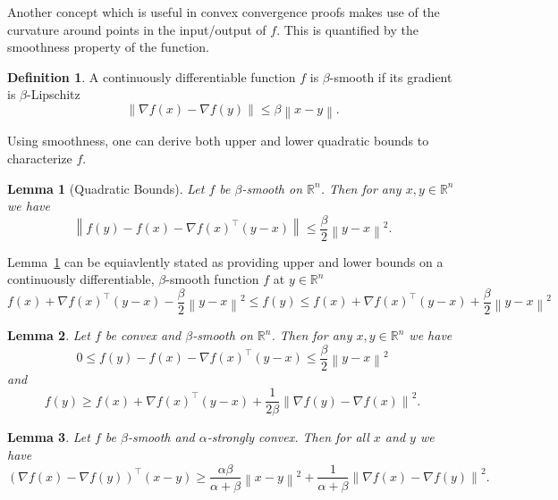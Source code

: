 \documentclass{article}
\newcommand{\R}{\mathbb R}
\newcommand{\norm}[1]{\left\| #1 \right\| }
\newtheorem{lemma}{Lemma}
\theoremstyle{definition}
\newtheorem{definition}{Definition}
\begin{document}
Another concept which is useful in convex convergence proofs makes use of the
curvature around points in the input/output of $f$. This is quantified by the
smoothness property of the function.

\begin{definition}
    A continuously differentiable function $f$ is $\beta$-smooth if its gradient
    is $\beta$-Lipschitz
    \begin{equation}
        \norm{\nabla f(x) - \nabla f(y)} \leq \beta \norm{x - y}.
    \end{equation}
\end{definition}

Using smoothness, one can derive both upper and lower quadratic bounds to
characterize $f$. 

\begin{lemma}[Quadratic Bounds]
    \label{lem:quadratic_bounds}
    Let $f$ be $\beta$-smooth on $\R^n$. Then for any $x, y \in \R^n$ we have 
    \begin{equation}
        \norm{f(y) - f(x) - \nabla {f(x)}^\intercal(y - x)} \leq \frac{\beta}{2}
        \norm{y - x}^2.
    \end{equation}
\end{lemma}

Lemma~\ref{lem:quadratic_bounds} can be equiavlently stated as providing upper
and lower bounds on a continuously differentiable, $\beta$-smooth function $f$
at $y \in \R^n$
\begin{equation}
    f(x) + \nabla {f(x)}^\intercal(y - x) - \frac{\beta}{2} \norm{y - x}^2 \leq
    f(y) \leq
    f(x) + \nabla {f(x)}^\intercal(y - x) + \frac{\beta}{2} \norm{y - x}^2
\end{equation}

\begin{lemma}
    \label{lem:con_smo}
    Let $f$ be convex and $\beta$-smooth on $\R^n$. Then for any $x, y \in \R^n$ we have
    \begin{equation}
        0 \leq f(y) - f(x) - \nabla {f(x)}^\intercal (y - x) \leq
        \frac{\beta}{2} \norm{y - x}^2
    \end{equation}
    and
    \begin{equation}
        f(y) \geq f(x) + \nabla {f(x)}^\intercal (y - x) + \frac{1}{2\beta}
        \norm{\nabla f(y) - \nabla f(x)}^2.
    \end{equation}
\end{lemma}

\begin{lemma}
    Let $f$ be $\beta$-smooth and $\alpha$-strongly convex. Then for all $x$ and
    $y$ we have
    \begin{equation}
        {(\nabla f(x) - \nabla f(y))}^\intercal (x - y) \geq
        \frac{\alpha\beta}{\alpha + \beta} \norm{x - y}^2 + \frac{1}{\alpha +
        \beta} \norm{\nabla f(x) - \nabla f(y)}^2.
    \end{equation}
\end{lemma}
\end{document}
